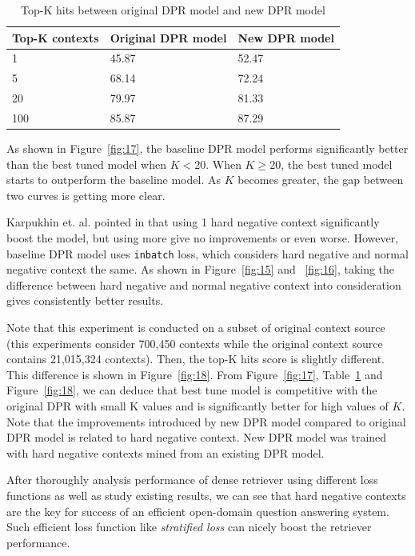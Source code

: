 \documentclass[12pt, sort&compress]{report}
\begin{document}
\begin{table}
	\caption{Top-K hits between original DPR model and new DPR model}
	\label{tab:04}
	\centering
	\begin{tabular}{lll}
		\hline
		Top-K contexts & Original DPR model & New DPR model \\\hline
		1 & 45.87 & 52.47 \\\hline
		5 & 68.14 & 72.24 \\\hline
		20 & 79.97 & 81.33 \\\hline
		100 & 85.87 & 87.29 \\\hline
	\end{tabular}
\end{table}
\par As shown in Figure~\ref{fig:17}, the baseline DPR model performs significantly better than the best tuned model when $K < 20$. When $K \geq 20$, the best tuned model starts to outperform the baseline model. As $K$ becomes greater, the gap between two curves is getting more clear.
\par Karpukhin et. al. pointed in \cite{karpukhin2020dense} that using 1 hard negative context significantly boost the model, but using more give no improvements or even worse. However, baseline DPR model uses {\tt inbatch} loss, which considers hard negative and normal negative context the same. As shown in Figure~\ref{fig:15} and ~\ref{fig:16}, taking the difference between hard negative and normal negative context into consideration gives consistently better results.
\par Note that this experiment is conducted on a subset of original context source (this experiments consider 700,450 contexts while the original context source contains 21,015,324 contexts). Then, the top-K hits score is slightly different. This difference is shown in Figure~\ref{fig:18}. From Figure~\ref{fig:17}, Table~\ref{tab:04} and Figure~\ref{fig:18}, we can deduce that best tune model is competitive with the original DPR with small K values and is significantly better for high values of $K$. Note that the improvements introduced by new DPR model compared to original DPR model is related to hard negative context. New DPR model was trained with hard negative contexts mined from an existing DPR model.
\par After thoroughly analysis performance of dense retriever using different loss functions as well as study existing results, we can see that hard negative contexts are the key for success of an efficient open-domain question answering system. Such efficient loss function like \textit{stratified loss} can nicely boost the retriever performance.
\end{document}
